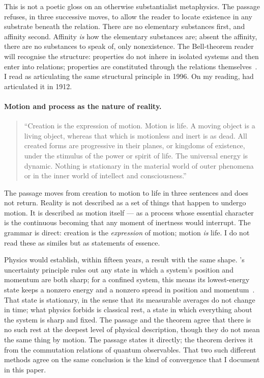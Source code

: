 This is not a poetic gloss on an otherwise substantialist metaphysics.
The passage refuses, in three successive moves, to allow the reader to locate
existence in any substrate beneath the relation.
There are no elementary substances first, and affinity second.
Affinity \emph{is} how the elementary substances are; absent the affinity, there
are no substances to speak of, only nonexistence.
The Bell-theorem reader will recognise the structure: properties do not inhere
in isolated systems and then enter into relations; properties are constituted
through the relations themselves~\citep{Bell1964,Rovelli1996}.
I read \citeauthor{Rovelli1996} as articulating the same structural principle in 1996.
On my reading, \AbdulBaha had articulated it in 1912.

\paragraph{Motion and process as the nature of reality.}
\begin{quote}
``Creation is the expression of motion. Motion is life. A moving object
is a living object, whereas that which is motionless and inert is as dead.
All created forms are progressive in their planes, or kingdoms of
existence, under the stimulus of the power or spirit of life. The
universal energy is dynamic. Nothing is stationary in the material
world of outer phenomena or in the inner world of intellect and
consciousness.''
\citep[Talk 52]{PUP}
\end{quote}

The passage moves from creation to motion to life in three sentences and does
not return.
Reality is not described as a set of things that happen to undergo motion.
It is described as motion itself --- as a process whose essential character is
the continuous becoming that any moment of inertness would interrupt.
The grammar is direct: creation is the \emph{expression} of motion; motion
\emph{is} life.
I do not read these as similes but as statements of essence.

Physics would establish, within fifteen years, a result with the same shape.
\citeauthor{Heisenberg1927}'s uncertainty principle rules out any state in
which a system's position and momentum are both sharp; for a confined system,
this means its lowest-energy state keeps a nonzero energy and a nonzero spread
in position and momentum~\citep{Heisenberg1927}.
That state is stationary, in the sense that its measurable averages do not
change in time; what physics forbids is classical rest, a state in which
everything about the system is sharp and fixed.
The passage and the theorem agree that there is no such rest at the deepest
level of physical description, though they do not mean the same thing by
motion.
The passage states it directly; the theorem derives it from the commutation
relations of quantum observables.
That two such different methods agree on the same conclusion is the kind of
convergence that I document in this paper.

